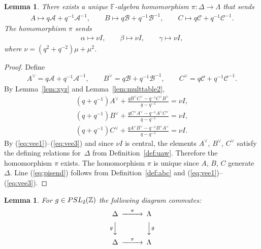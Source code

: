 \documentclass[10pt,a4paper]{amsart}
\numberwithin{equation}{section}
\newtheorem{Lemma}[Theorem]{Lemma}
\begin{document}
\begin{Lemma}
\label{prop:uhomoh}
There exists a unique $\mathbb F$-algebra homomorphism
$\pi:\Delta \to \Lambda $
 that sends
\begin{gather*}
A \mapsto q \mathcal A+q^{-1}{\mathcal A}^{-1},
 \qquad
B \mapsto q \mathcal B+q^{-1}{\mathcal B}^{-1},
\qquad
C \mapsto q\mathcal C+q^{-1}{\mathcal C}^{-1}.
\end{gather*}
The homomorphism $\pi$ sends
\begin{gather}
 \alpha \mapsto \nu I,
 \qquad
\beta \mapsto  \nu I,
 \qquad
\gamma \mapsto \nu I,
\label{eq:pisend}
\end{gather}
where $\nu= (q^2+q^{-2})\mu + \mu^2$.
\end{Lemma}

\begin{proof}
Def\/ine
\begin{gather*}
A^\vee = q\mathcal A+q^{-1}{\mathcal A}^{-1},
\qquad
B^\vee =q\mathcal B+q^{-1}{\mathcal B}^{-1},
\qquad
C^\vee = q\mathcal C+q^{-1}{\mathcal C}^{-1}.
\end{gather*}
By Lemma~\ref{lem:xyz}
and Lemma~\ref{lem:multtable2},
\begin{gather}
(q+q^{-1})A^\vee+ \frac{qB^\vee C^\vee-q^{-1}C^\vee B^\vee}{q-q^{-1}}
  = \nu I,
\label{eq:vee1}
\\
(q+q^{-1})B^\vee+
\frac{qC^\vee A^\vee -q^{-1}A^\vee C^\vee }{q-q^{-1}}
 =  \nu I,
\label{eq:vee2}
\\
(q+q^{-1})C^\vee +
\frac{qA^\vee B^\vee -q^{-1}B^\vee A^\vee }{q-q^{-1}}
 =  \nu I.
\label{eq:vee3}
\end{gather}
By
(\ref{eq:vee1})--(\ref{eq:vee3}) and
since
 $\nu I$ is central, the elements
$A^\vee$, $B^\vee$, $C^\vee$ satisfy the
def\/ining relations for~$\Delta $ from
Def\/inition~\ref{def:uaw}.
Therefore
the homomorphism $\pi$ exists. The homomorphism $\pi$
is unique since $A$, $B$, $C$ generate~$\Delta $. Line
(\ref{eq:pisend})
follows from
Def\/inition~\ref{def:abc} and
(\ref{eq:vee1})--(\ref{eq:vee3}).
\end{proof}



\begin{Lemma}
\label{lem:comdiagf}
For $g \in
{\rm  {PSL}}_2(\mathbb Z)$
 the following diagram commutes:
\[
\begin{CD}
\Delta  @>\pi>>
         \Lambda  \\
	  @Vg VV                     @VVg V \\
	 \Delta
	  @>\pi>>
	          \Lambda
		    \end{CD}
		    \]

\end{Lemma}
\end{document}
